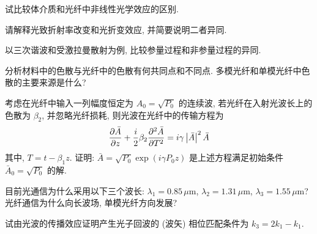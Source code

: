 \documentclass{assignment}
\begin{document}
\begin{prob}
    试比较体介质和光纤中非线性光学效应的区别.
\end{prob}
\begin{sol}
    
\end{sol}

\begin{prob}
    请解释光致折射率改变和光折变效应, 并简要说明二者异同.
\end{prob}
\begin{sol}
    
\end{sol}

\begin{prob}
    以三次谐波和受激拉曼散射为例, 比较参量过程和非参量过程的异同.
\end{prob}
\begin{sol}
    
\end{sol}

\begin{prob}
    分析材料中的色散与光纤中的色散有何共同点和不同点. 多模光纤和单模光纤中色散的主要来源是什么?
\end{prob}
\begin{sol}
    
\end{sol}

\begin{prob}
    考虑在光纤中输入一列幅度恒定为 $A_0=\sqrt{P_0}$ 的连续波, 若光纤在入射光波长上的色散为 $\beta_2$, 并忽略光纤损耗, 则光波在光纤中的传输方程为
    \[
        \frac{\partial\bar{A}}{\partial z}+\frac{i}{2}\beta_2\frac{\partial^2\bar{A}}{\partial T^2}=i\gamma\left\lvert\bar{A}\right\rvert^2\bar{A}
    \]
    其中, $T=t-\beta_1z$. 证明: $\bar{A}=\sqrt{P_0}\exp(i\gamma P_0z)$ 是上述方程满足初始条件 $\bar{A}_0=\sqrt{P_0}$ 的解.
\end{prob}
\begin{pf}
    
\end{pf}

\begin{prob}
    目前光通信为什么采用以下三个波长: $\lambda_1=0.85\,\mu$m, $\lambda_2=1.31\,\mu$m, $\lambda_3=1.55\,\mu$m? 光纤通信为什么向长波场, 单模光纤方向发展?
\end{prob}
\begin{sol}
    
\end{sol}

\begin{prob}
    试由光波的传播效应证明产生光子回波的 (波矢) 相位匹配条件为 $k_3=2k_1-k_1$.
\end{prob}
\begin{pf}

\end{pf}
\end{document}

